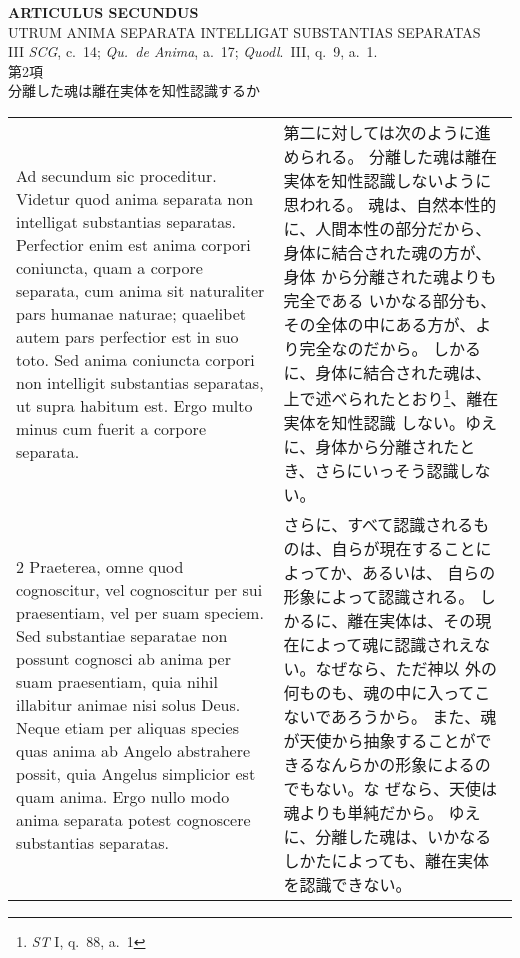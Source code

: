 \documentclass[10pt]{jsarticle} %
\begin{document}
\newpage
{}

\begin{center}
 {\Large {\bf ARTICULUS SECUNDUS}}\\
 {\large UTRUM ANIMA SEPARATA INTELLIGAT SUBSTANTIAS SEPARATAS}\\
{\footnotesize III {\it SCG}, c.~14; {\it Qu.~de Anima}, a.~17; {\it
 Quodl}.~III, q.~9, a.~1.}\\
{\Large 第2項\\分離した魂は離在実体を知性認識するか}

\end{center}

\begin{longtable}{p{21em}p{21em}}

{\huge A}{\sc d secundum sic proceditur}. Videtur quod
anima separata non intelligat substantias separatas. Perfectior enim est
anima corpori coniuncta, quam a corpore separata, cum anima sit
naturaliter pars humanae naturae; quaelibet autem pars perfectior est in
suo toto. Sed anima coniuncta corpori non intelligit substantias
separatas, ut supra habitum est. Ergo multo minus cum fuerit a corpore
separata.

&

第二に対しては次のように進められる。
分離した魂は離在実体を知性認識しないように思われる。
魂は、自然本性的に、人間本性の部分だから、身体に結合された魂の方が、身体
 から分離された魂よりも完全である
いかなる部分も、その全体の中にある方が、より完全なのだから。
しかるに、身体に結合された魂は、上で述べられたとおり\footnote{{\it ST}
 I, q.~88, a.~1}、離在実体を知性認識
 しない。ゆえに、身体から分離されたとき、さらにいっそう認識しない。

\\


2 {\sc Praeterea}, omne quod cognoscitur, vel
cognoscitur per sui praesentiam, vel per suam speciem. Sed substantiae
separatae non possunt cognosci ab anima per suam praesentiam, quia nihil
illabitur
animae nisi solus Deus. Neque etiam per aliquas species quas
anima ab Angelo abstrahere possit, quia Angelus simplicior est quam
anima. Ergo nullo modo anima separata potest cognoscere substantias
separatas.

&

さらに、すべて認識されるものは、自らが現在することによってか、あるいは、
 自らの形象によって認識される。
しかるに、離在実体は、その現在によって魂に認識されえない。なぜなら、ただ神以
 外の何ものも、魂の中に入ってこないであろうから。
また、魂が天使から抽象することができるなんらかの形象によるのでもない。な
 ぜなら、天使は魂よりも単純だから。
ゆえに、分離した魂は、いかなるしかたによっても、離在実体を認識できない。


\end{longtable}
\end{document}
